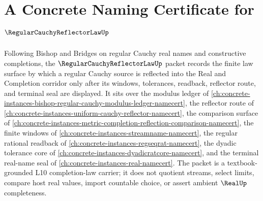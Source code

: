 \chapter{A Concrete Naming Certificate for $\RegularCauchyReflectorLawUp$}
\label{ch:concrete-instances-regular-cauchy-reflector-law-namecert}

Following Bishop and Bridges on regular Cauchy real names and constructive completions, the $\RegularCauchyReflectorLawUp$ packet records the finite law surface by which a regular Cauchy source is reflected into the Real and Completion corridor only after its windows, tolerances, readback, reflector route, and terminal seal are displayed. It sits over the modulus ledger of \autoref{ch:concrete-instances-bishop-regular-cauchy-modulus-ledger-namecert}, the reflector route of \autoref{ch:concrete-instances-uniform-cauchy-reflector-namecert}, the comparison surface of \autoref{ch:concrete-instances-metric-completion-reflection-comparison-namecert}, the finite windows of \autoref{ch:concrete-instances-streamname-namecert}, the regular rational readback of \autoref{ch:concrete-instances-regseqrat-namecert}, the dyadic tolerance core of \autoref{ch:concrete-instances-dyadicratcore-namecert}, and the terminal real-name seal of \autoref{ch:concrete-instances-real-namecert}. The packet is a textbook-grounded L10 completion-law carrier; it does not quotient streams, select limits, compare host real values, import countable choice, or assert ambient $\RealUp$ completeness.

